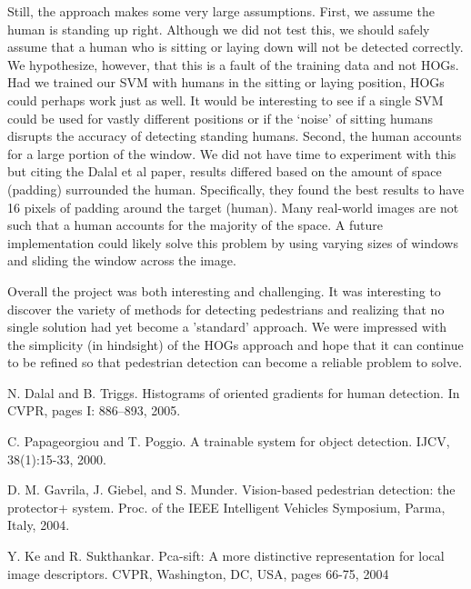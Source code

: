 \documentclass[a4paper,11pt]{article}
\begin{document}
\begin{multicols}{2}
Still, the approach makes some very large assumptions. First, we assume the human is standing up right. 
Although we did not test this, we should safely assume that a human who is sitting or laying down 
will not be detected correctly. We hypothesize, however, that this is a fault of the training data and not 
HOGs. Had we trained our SVM with humans in the sitting or laying position, HOGs could perhaps work just as well. 
It would be interesting to see if a single SVM could be used for vastly different positions or if the 
‘noise’ of sitting humans disrupts the accuracy of detecting standing humans. Second, the human accounts 
for a large portion of the window. We did not have time to experiment with this but citing the Dalal et 
al paper, results differed based on the amount of space (padding) surrounded the human. Specifically, 
they found the best results to have 16 pixels of padding around the target (human). Many real-world 
images are not such that a human accounts for the majority of the space. A future implementation could 
likely solve this problem by using varying sizes of windows and sliding the window across the image.

Overall the project was both interesting and challenging. It was interesting to discover the variety of 
methods for detecting pedestrians and realizing that no single solution had yet become a 
'standard’ approach. We were impressed with the simplicity (in hindsight) of the HOGs approach and 
hope that it can continue to be refined so that pedestrian detection can become a reliable problem to solve.
\end{multicols}

\begin{thebibliography}{1}

   N. Dalal and B. Triggs. Histograms of oriented gradients for human detection. 
  In CVPR, pages I: 886–893, 2005.

   C. Papageorgiou and T. Poggio. A trainable system for object detection. IJCV, 38(1):15-33, 2000.

   D. M. Gavrila, J. Giebel, and S. Munder. Vision-based pedestrian detection: the protector+ system. Proc. of the IEEE Intelligent Vehicles Symposium, Parma, Italy, 2004.

   Y. Ke and R. Sukthankar. Pca-sift: A more distinctive representation for local image descriptors. CVPR, Washington, DC, USA, pages 66-75, 2004

\end{thebibliography}
\end{document}
